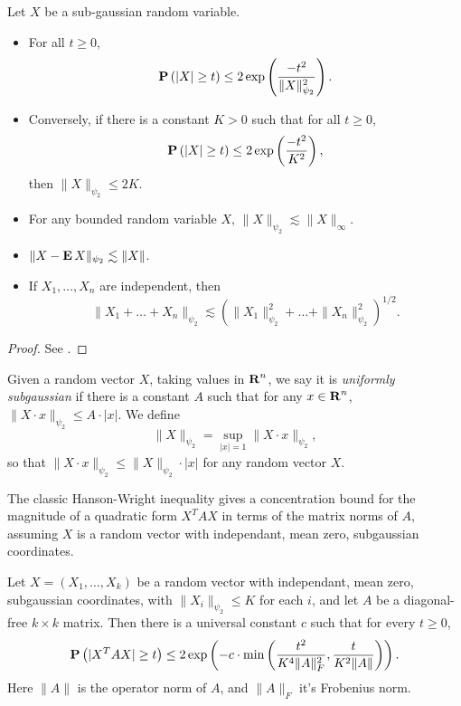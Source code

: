 \begin{theorem}
	Let $X$ be a sub-gaussian random variable.
	\begin{itemize}
		\item For all $t \geq 0$,
		\[ \operatorname{\mathbf{P}} \left( |X| \geq t \right) \leq 2 \exp \left( \frac{-t^2}{\| X \|_{\psi_2}^2} \right). \]

		\item Conversely, if there is a constant $K > 0$ such that for all $t \geq 0$,
		\[ \operatorname{\mathbf{P}} \left( |X| \geq t \right) \leq 2 \exp \left( \frac{-t^2}{K^2} \right), \]
		then $\| X \|_{\psi_2} \leq 2K$.

		\item For any bounded random variable $X$, $\| X \|_{\psi_2} \lesssim \| X \|_\infty$.

		\item $\| X - \operatorname{\mathbf{E}} X \|_{\psi_2} \lesssim \| X \|$.

		\item If $X_1, \dots, X_n$ are independent, then
		\[ \| X_1 + \dots + X_n \|_{\psi_2} \lesssim \left( \| X_1 \|_{\psi_2}^2 + \dots + \| X_n \|_{\psi_2}^2 \right)^{1/2}. \] 
	\end{itemize}
\end{theorem}
\begin{proof} See \cite{Vershynin}. \end{proof}

Given a random vector $X$, taking values in $\operatorname{\mathbf{R}}^n$, we say it is \emph{uniformly subgaussian} if there is a constant $A$ such that for any $x \in \operatorname{\mathbf{R}}^n$, $\| X \cdot x \|_{\psi_2} \leq A \cdot |x|$. We define
%
\[ \| X \|_{\psi_2} = \sup_{|x| = 1} \| X \cdot x \|_{\psi_2}, \]
%
so that $\| X \cdot x \|_{\psi_2} \leq \| X \|_{\psi_2} \cdot |x|$ for any random vector $X$.

The classic Hanson-Wright inequality gives a concentration bound for the magnitude of a quadratic form $X^T A X$ in terms of the matrix norms of $A$, assuming $X$ is a random vector with independant, mean zero, subgaussian coordinates.

\begin{theorem}
	Let $X = (X_1, \dots, X_k)$ be a random vector with independant, mean zero, subgaussian coordinates, with $\| X_i \|_{\psi_2} \leq K$ for each $i$, and let $A$ be a diagonal-free $k \times k$ matrix. Then there is a universal constant $c$ such that for every $t \geq 0$,
	\[ \operatorname{\mathbf{P}} \left( |X^TAX| \geq t \right) \leq 2 \exp \left( -c \cdot \min \left( \frac{t^2}{K^4 \| A \|_F^2}, \frac{t}{K^2 \| A \|} \right) \right). \]
	Here $\| A \|$ is the operator norm of $A$, and $\| A \|_F$ it's Frobenius norm.
\end{theorem}

